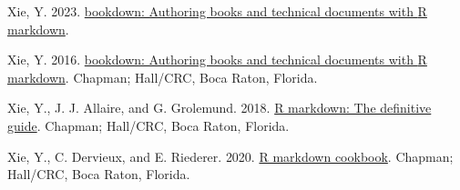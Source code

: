 \documentclass[fleqn,10pt,lineno]{wlpeerj} %
\newlength{\cslhangindent}
\newenvironment{CSLReferences}[2] %
 {\begin{list}{}{%
  \setlength{\itemindent}{0pt}
  \setlength{\leftmargin}{0pt}
  \setlength{\parsep}{0pt}
  \ifodd #1
   \setlength{\leftmargin}{\cslhangindent}
   \setlength{\itemindent}{-1\cslhangindent}
  \fi
  \setlength{\itemsep}{#2\baselineskip}}}
 {\end{list}}
\begin{document}
\begin{CSLReferences}{1}{0}
Xie, Y. 2023. \href{https://github.com/rstudio/bookdown}{{b}ookdown: Authoring books and technical documents with {R} markdown}.

Xie, Y. 2016. \href{https://bookdown.org/yihui/bookdown}{{b}ookdown: Authoring books and technical documents with {R} markdown}. Chapman; Hall/CRC, Boca Raton, Florida.

Xie, Y., J. J. Allaire, and G. Grolemund. 2018. \href{https://bookdown.org/yihui/rmarkdown}{R markdown: The definitive guide}. Chapman; Hall/CRC, Boca Raton, Florida.

Xie, Y., C. Dervieux, and E. Riederer. 2020. \href{https://bookdown.org/yihui/rmarkdown-cookbook}{R markdown cookbook}. Chapman; Hall/CRC, Boca Raton, Florida.

\end{CSLReferences}
\end{document}
